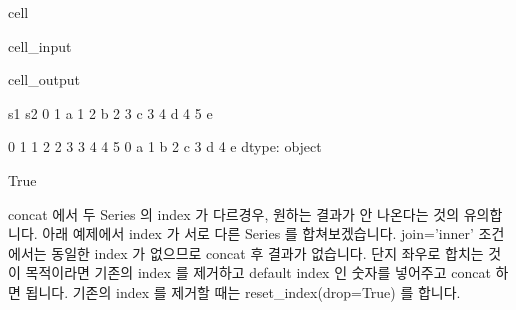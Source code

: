 \documentclass[letterpaper,10pt,english]{jupyterBook}
\begin{document}
\begin{sphinxuseclass}{cell}
\begin{sphinxVerbatimInput}
\begin{sphinxuseclass}{cell_input}
\begin{sphinxVerbatim}[commandchars=\\\{\}]
  \PYG{p}{[} \PYG{p}{]}   
  \PYG{p}{[} \PYG{p}{]}   
 
\end{sphinxVerbatim}

\end{sphinxuseclass}\end{sphinxVerbatimInput}
\begin{sphinxVerbatimOutput}

\begin{sphinxuseclass}{cell_output}
\begin{sphinxVerbatim}[commandchars=\\\{\}]
   s1 s2
0   1  a
1   2  b
2   3  c
3   4  d
4   5  e


0    1
1    2
2    3
3    4
4    5
0    a
1    b
2    c
3    d
4    e
dtype: object


True
\end{sphinxVerbatim}

\end{sphinxuseclass}\end{sphinxVerbatimOutput}

\end{sphinxuseclass}
\sphinxAtStartPar
 concat 에서 두 Series 의 index 가 다르경우, 원하는 결과가 안 나온다는 것의 유의합니다. 아래 예제에서 index 가 서로 다른 Series 를 합쳐보겠습니다. join=’inner’ 조건에서는 동일한 index 가 없으므로 concat 후 결과가 없습니다. 단지 좌\sphinxhyphen{}우로 합치는 것이 목적이라면 기존의 index 를 제거하고 default index 인 숫자를 넣어주고 concat 하면 됩니다. 기존의 index 를 제거할 때는  reset\_index(drop=True) 를 합니다.
\end{document}
